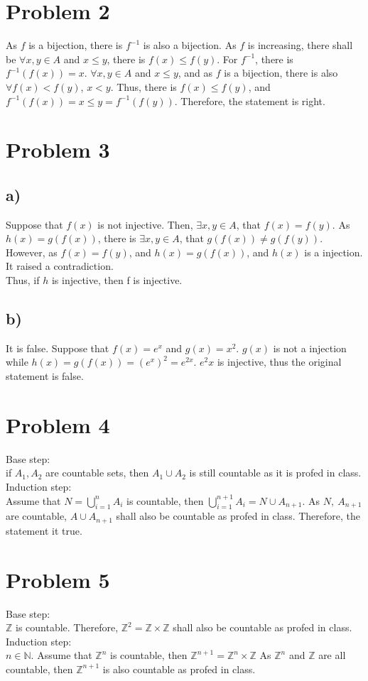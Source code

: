 \documentclass{article}
\begin{document}
\section*{Problem 2}
    As \(f\) is a bijection, there is \(f^{-1}\) is also a bijection. As \(f\) is increasing, there shall be 
    \(\forall x,y\in A\) and \(x\leqslant y\), there is \(f(x)\leqslant f(y)\). For \(f^{-1}\), there is \(f^{-1}(f(x))=x\).
    \(\forall x,y\in A\) and \(x\leqslant y\), and as \(f\) is a bijection, there is also \(\forall f(x)<f(y)\), \(x<y\). Thus, there is \(f(x)\leqslant f(y)\), and \(f^{-1}(f(x))=x\leqslant y=f^{-1}(f(y))\).
    Therefore, the statement is right.
\section*{Problem 3}
\subsection*{a)}
    Suppose that \(f(x)\) is not injective. Then, \(\exists x,y \in A\), that \(f(x)=f(y)\). As \(h(x)=g(f(x))\), there is 
    \(\exists x,y \in A\), that \(g(f(x))\neq g(f(y))\). However, as \(f(x)=f(y)\), and \(h(x)=g(f(x))\), and \(h(x)\) is 
    a injection. It raised a contradiction.\\
    Thus, if \(h\) is injective, then f is injective.
\subsection*{b)}
    It is false. Suppose that \(f(x)=e^x\) and \(g(x)=x^2\). \(g(x)\) is not a injection while 
    \(h(x)=g(f(x))=(e^x)^2=e^{2x}\). \(e^2x\) is injective, thus the original statement is false.
\section*{Problem 4}
    Base step:\\
    if \( A_1, A_2\) are countable sets, then \(A_1 \cup A_2\) is still countable as it is profed in class.
    Induction step:\\
    Assume that \(\displaystyle{N= \bigcup_{i=1}^{n}A_i}\) is countable, then
    \(\displaystyle{\bigcup_{i=1}^{n+1}A_i} = N\cup A_{n+1}\). As \(N,\ A_{n+1}\) are countable,
    \(A\cup A_{n+1}\) shall also be countable as profed in class.
    Therefore, the statement it true.
\section*{Problem 5}
    Base step:\\
    \(\mathbb{Z}\) is countable. Therefore, \(\mathbb{Z}^2=\mathbb{Z}\times \mathbb{Z}\) shall also be countable as profed in class.
    Induction step:\\
    \(n\in \mathbb{N}\). Assume that \(\mathbb{Z}^n\) is countable, then \(\mathbb{Z}^{n+1}=\mathbb{Z}^n\times \mathbb{Z}\)
    As \( \mathbb{Z}^n\) and \(\mathbb{Z}\) are all countable, then \(\mathbb{Z}^{n+1}\) is also countable as profed in class.
\end{document}
